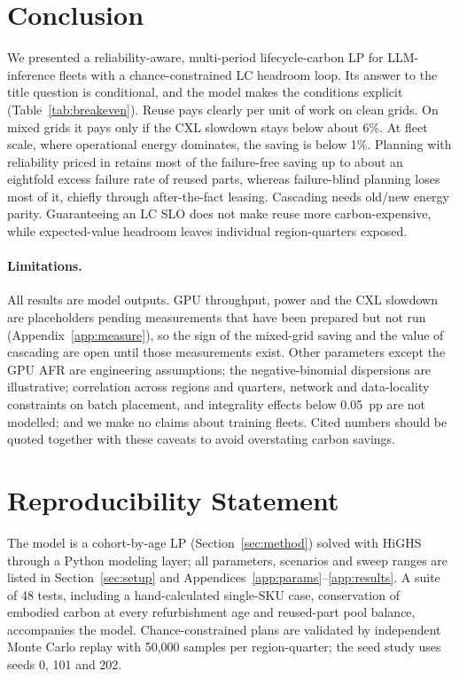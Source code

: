 \documentclass{article} %
\begin{document}
\section{Conclusion}
\label{sec:conclusion}
We presented a reliability-aware, multi-period lifecycle-carbon LP for LLM-inference fleets with a chance-constrained LC headroom loop. Its answer to the title question is conditional, and the model makes the conditions explicit (Table~\ref{tab:breakeven}). Reuse pays clearly per unit of work on clean grids. On mixed grids it pays only if the CXL slowdown stays below about 6\%. At fleet scale, where operational energy dominates, the saving is below 1\%. Planning with reliability priced in retains most of the failure-free saving up to about an eightfold excess failure rate of reused parts, whereas failure-blind planning loses most of it, chiefly through after-the-fact leasing. Cascading needs old/new energy parity. Guaranteeing an LC SLO does not make reuse more carbon-expensive, while expected-value headroom leaves individual region-quarters exposed.

\paragraph{Limitations.} All results are model outputs. GPU throughput, power and the CXL slowdown are placeholders pending measurements that have been prepared but not run (Appendix~\ref{app:measure}), so the sign of the mixed-grid saving and the value of cascading are open until those measurements exist. Other parameters except the GPU AFR are engineering assumptions; the negative-binomial dispersions are illustrative; correlation across regions and quarters, network and data-locality constraints on batch placement, and integrality effects below 0.05~pp are not modelled; and we make no claims about training fleets. Cited numbers should be quoted together with these caveats to avoid overstating carbon savings.

\section*{Reproducibility Statement}
The model is a cohort-by-age LP (Section~\ref{sec:method}) solved with HiGHS through a Python modeling layer; all parameters, scenarios and sweep ranges are listed in Section~\ref{sec:setup} and Appendices~\ref{app:params}--\ref{app:results}. A suite of 48 tests, including a hand-calculated single-SKU case, conservation of embodied carbon at every refurbishment age and reused-part pool balance, accompanies the model. Chance-constrained plans are validated by independent Monte Carlo replay with 50,000 samples per region-quarter; the seed study uses seeds 0, 101 and 202.
\end{document}
